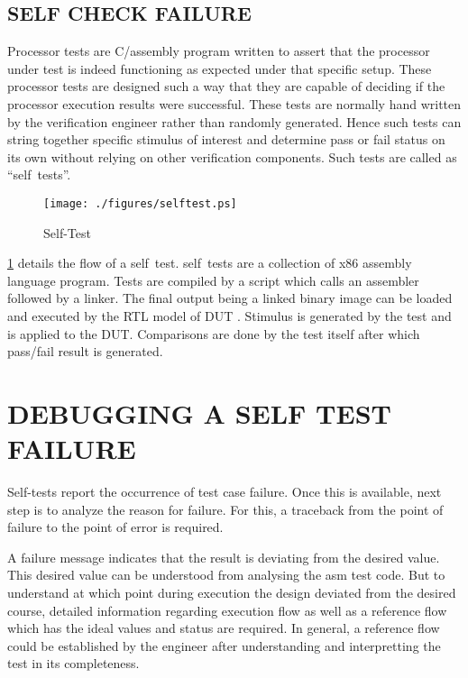 \subsection {SELF CHECK FAILURE}

Processor tests are C/assembly program written to assert that the processor under test is indeed functioning as expected under that specific setup. These processor tests are designed such a way that they are capable of deciding if the processor execution results were successful. These tests are normally hand written by the verification engineer rather than randomly generated.  Hence such tests can string together specific stimulus of interest and determine pass or fail status on its own without relying on other verification components. Such tests are called as ``self~tests''.


\begin{figure}[h]
\centering
\texttt{[image: ./figures/selftest.ps]}
\caption{Self-Test} 
\label{fig:selftest.ps}
\end{figure}

\figurename{\ref{fig:selftest.ps}} details the flow of a self~test. self~tests are a collection of x86 assembly language program. Tests are compiled by a script which calls an assembler followed by a linker. The final output being a linked binary image can be loaded and executed by the RTL model of DUT . Stimulus is generated by the test and is applied to the DUT. Comparisons are done by the test itself after which pass/fail result is generated.



\section{DEBUGGING A SELF TEST FAILURE}

Self-tests report the occurrence of test case failure. Once this is available, next step is to analyze the reason for failure.  For this, a traceback from the point of failure to the point of error is required. 

A failure message indicates that the result is deviating from the desired value. This desired value can be understood from analysing the asm test code. But to understand at which point during execution the design deviated from the desired course, detailed information regarding execution flow as well as a reference flow which has the ideal values and status are required. In general, a reference flow could be established by the engineer after understanding and interpretting the test in its completeness.
 
